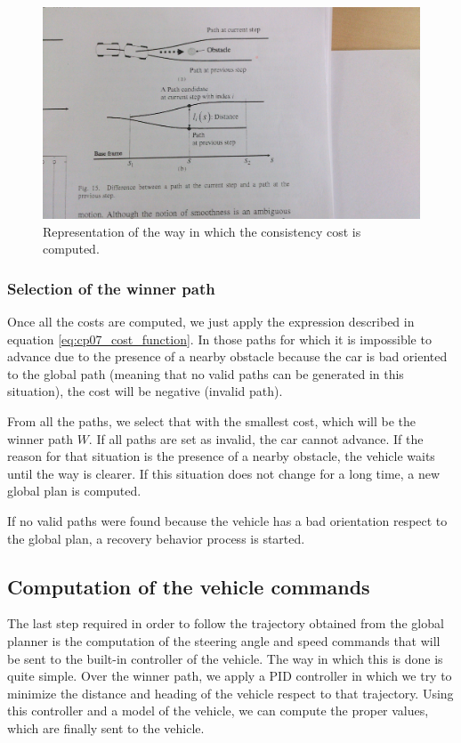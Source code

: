 \begin{figure}[h!]
  \centering
  \includegraphics[width=\textwidth]{consistency_cost}
  \caption{Representation of the way in which the consistency cost is computed.}\label{fig:cp07_consistency_cost}
\end{figure}

\subsubsection{Selection of the winner path}\label{ch:chapter07_01_04_01}

Once all the costs are computed, we just apply the expression described in equation \ref{eq:cp07_cost_function}. In those paths for which it is impossible to advance due to the presence of a nearby obstacle because the car is bad oriented to the global path (meaning that no valid paths can be generated in this situation), the cost will be negative (invalid path).

From all the paths, we select that with the smallest cost, which will be the winner path $W$. If all paths are set as invalid, the car cannot advance. If the reason for that situation is the presence of a nearby obstacle, the vehicle waits until the way is clearer. If this situation does not change for a long time, a new global plan is computed.

If no valid paths were found because the vehicle has a bad orientation respect to the global plan, a recovery behavior process is started.

\subsection{Computation of the vehicle commands}\label{ch:chapter07_01_05}

The last step required in order to follow the trajectory obtained from the global planner is the computation of the steering angle and speed commands that will be sent to the built-in controller of the vehicle. The way in which this is done is quite simple. Over the winner path, we apply a \ac{PID} controller in which we try to minimize the distance and heading of the vehicle respect to that trajectory. Using this controller and a model of the vehicle, we can compute the proper values, which are finally sent to the vehicle.

